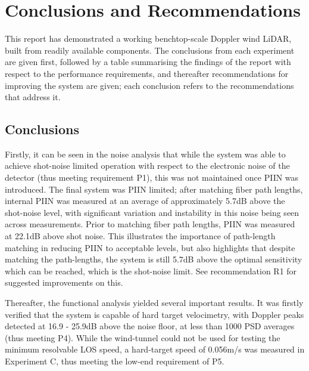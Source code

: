 \chapter{Conclusions and Recommendations}
\label{sec:conclusionsAndRecommendations}
This report has demonstrated a working benchtop-scale Doppler wind LiDAR,
built from readily available components. The conclusions from each
experiment are given first, followed by a table summarising the findings of the report with respect to the performance requirements, and thereafter recommendations for improving the
system are given; each conclusion refers to the recommendations that address it.

\section{Conclusions}

 Firstly, it can be seen in the noise analysis that while the system was able to achieve shot-noise limited operation with respect to the electronic noise of the detector (thus meeting requirement P1), this was not maintained once PIIN was introduced. The final system was PIIN limited; after matching fiber path lengths, internal PIIN was measured at an average of approximately 5.7dB above the shot-noise level, with significant variation and instability in this noise being seen across measurements. Prior to matching fiber path lengths, PIIN was measured at 22.1dB above shot noise. This illustrates the importance of path-length matching in reducing PIIN to acceptable levels, but also highlights that despite matching the path-lengths, the system is still 5.7dB above the optimal sensitivity which can be reached, which is the shot-noise limit. See recommendation R1 for suggested improvements on this. 

Thereafter, the functional analysis yielded several important results. It was firstly verified that the system is capable of hard target velocimetry, with Doppler peaks detected at 16.9 - 25.9dB above the noise floor, at less than 1000 PSD averages (thus meeting P4). While the wind-tunnel could not be used for testing the minimum resolvable LOS speed, a hard-target speed of 0.056m/s was measured in Experiment C, thus meeting the low-end requirement of P5.

